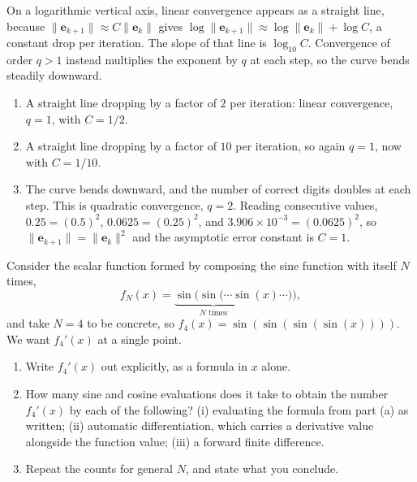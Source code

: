 \begin{solution}
    
    On a logarithmic vertical axis, linear convergence appears as a straight line, because $\|\mathbf{e}_{k+1}\| \approx C\|\mathbf{e}_k\|$ gives $\log\|\mathbf{e}_{k+1}\| \approx \log\|\mathbf{e}_k\| + \log C$, a constant drop per iteration. The slope of that line is $\log_{10} C$. Convergence of order $q > 1$ instead multiplies the exponent by $q$ at each step, so the curve bends steadily downward.
    \begin{enumerate}[label=(\alph*)]
        \item A straight line dropping by a factor of $2$ per iteration: linear convergence, $q = 1$, with $C = 1/2$.
        \item A straight line dropping by a factor of $10$ per iteration, so again $q = 1$, now with $C = 1/10$. 
        \item The curve bends downward, and the number of correct digits doubles at each step. This is quadratic convergence, $q = 2$. Reading consecutive values, $0.25 = (0.5)^2$, $0.0625 = (0.25)^2$, and $3.906 \times 10^{-3} = (0.0625)^2$, so $\|\mathbf{e}_{k+1}\| = \|\mathbf{e}_k\|^2$ and the asymptotic error constant is $C = 1$.
    \end{enumerate}

    
\end{solution}

\begin{exercise} %
    
    Consider the scalar function formed by composing the sine function with itself $N$ times,
    \[
        f_N(x) = \underbrace{\sin(\sin(\cdots \sin}_{N \text{ times}}(x)\cdots)) ,
    \]
    and take $N = 4$ to be concrete, so $f_4(x) = \sin(\sin(\sin(\sin(x))))$. We want $f_4'(x)$ at a single point.
    \begin{enumerate}[label=(\alph*)]
        \item Write $f_4'(x)$ out explicitly, as a formula in $x$ alone.
        \item How many sine and cosine evaluations does it take to obtain the number $f_4'(x)$ by each of the following? (i) evaluating the formula from part (a) as written; (ii) automatic differentiation, which carries a derivative value alongside the function value; (iii) a forward finite difference.
        \item Repeat the counts for general $N$, and state what you conclude.
    \end{enumerate}
    
\end{exercise}

